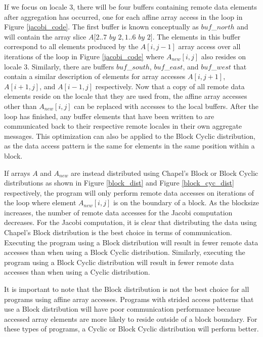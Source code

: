 If we focus on locale 3, there will be four buffers containing remote data elements after aggregation has occurred, one for each affine array access in the loop in Figure \ref{jacobi_code}. The first buffer is known conceptually as $buf$\_$north$ and will contain the array slice $A[2..7$ $by$ $2, 1..6$ $by$ $2]$. The elements in this buffer correspond to all elements produced by the $A[i, j-1]$ array access over all iterations of the loop in Figure \ref{jacobi_code} where $A_{new}[i, j]$ also resides on locale 3. Similarly, there are buffers $buf$\_$south$, $buf$\_$east$, and $buf$\_$west$ that contain a similar description of elements for array accesses $A[i, j+1]$, $A[i+1, j]$, and $A[i-1, j]$ respectively. Now that a copy of all remote data elements reside on the locale that they are used from, the affine array accesses other than $A_{new}[i, j]$ can be replaced with accesses to the local buffers. After the loop has finished, any buffer elements that have been written to are communicated back to their respective remote locales in their own aggregate messages. This optimization can also be applied to the Block Cyclic distribution, as the data access pattern is the same for elements in the same position within a block. 

If arrays $A$ and $A_{new}$ are instead distributed using Chapel's Block or Block Cyclic distributions as shown in Figure \ref{block_dist} and Figure \ref{block_cyc_dist} respectively, the program will only perform remote data accesses on iterations of the loop where element $A_{new}[i, j]$ is on the boundary of a block. As the blocksize increases, the number of remote data accesses for the Jacobi computation decreases. For the Jacobi computation, it is clear that distributing the data using Chapel's Block distribution is the best choice in terms of communication. Executing the program using a Block distribution will result in fewer remote data accesses than when using a Block Cyclic distribution. Similarly, executing the program using a Block Cyclic distribution will result in fewer remote data accesses than when using a Cyclic distribution. 

It is important to note that the Block distribution is not the best choice for all programs using affine array accesses. Programs with strided access patterns that use a Block distribution will have poor communication performance because accessed array elements are more likely to reside outside of a block boundary. For these types of programs, a Cyclic or Block Cyclic distribution will perform better. 
